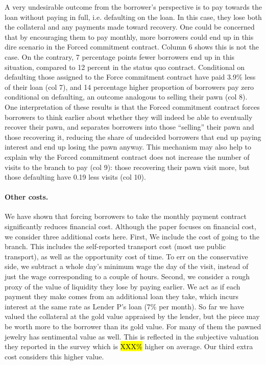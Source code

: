 \documentclass[oneside,11pt]{article}
\begin{document}
A very undesirable outcome from the borrower's perspective is to pay towards the loan without paying in full, i.e. defaulting on the loan. In this case, they lose both the collateral and any payments made toward recovery. One could be concerned that by encouraging them to pay monthly, more borrowers could end up in this dire scenario in the Forced commitment contract. Column 6 shows this is not the case. On the contrary,  7 percentage points fewer borrowers end up in this situation, compared to 12 percent in the status quo contract. Conditional on defaulting those assigned to the Force commitment contract have paid 3.9\% less of their loan (col 7), and 14 percentage higher proportion of borrowers pay zero conditional on defaulting, an outcome analogous to selling their pawn (col 8). One interpretation of these results is that the Forced commitment contract forces borrowers to think earlier about whether they will indeed be able to eventually recover their pawn, and separates borrowers into those ``selling'' their pawn and those recovering it, reducing the share of undecided borrowers that end up paying interest and end up losing the pawn anyway. This mechanism may also help to explain why the Forced commitment contract does not increase the number of visits to the branch to pay (col 9): those recovering their pawn visit more, but those defaulting have 0.19 less visits (col 10).

\paragraph{Other costs.} We have shown that forcing borrowers to take the monthly payment contract significantly reduces financial cost. Although the paper focuses on financial cost, we consider three additional costs here. First, We include the cost of going to the branch. This includes the self-reported transport cost (most use public transport), as well as the opportunity cost of time. To err on the conservative side, we subtract a whole day's minimum wage the day of the visit, instead of just the wage corresponding to a couple of hours. Second, we consider a rough proxy of the value of liquidity they lose by paying earlier. We act as if each payment they make comes from an additional loan they take, which incurs interest at the same rate as Lender P's loan (7\% per month). So far we have valued the collateral at the gold value appraised by the lender, but the piece may be worth more to the borrower than its gold value.  For many of them the pawned jewelry has sentimental value as well. This is reflected in the subjective valuation they reported in the survey which is \hl{XXX\%} higher on average. Our third extra cost considers this higher value.
\end{document}
